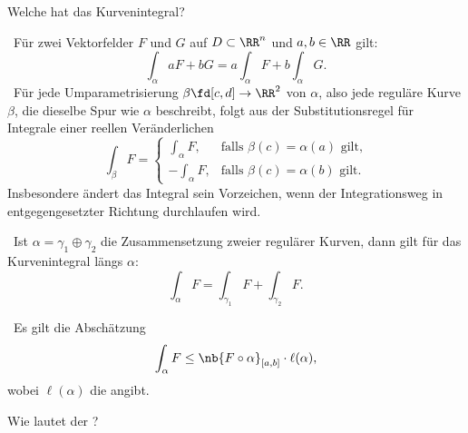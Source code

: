 \begin{frage}
  Welche  hat das Kurvenintegral?
\end{frage}

\begin{antwort}
  \, Für zwei Vektorfelder $F$ und $G$ auf $D\subset\RR^n$ 
  und $a , b\in \RR$ gilt:
  \[
  \int_{\alpha} a F + b G   = 
  a\int_\alpha F   + b\int_\alpha G.
  \]
  \noindent
  \, Für jede Umparametrisierung 
  $\beta\fd [c,d] \to \RR^2$ von $\alpha$, 
  also jede reguläre Kurve $\beta$, 
  die dieselbe Spur wie $\alpha$ beschreibt,  
  folgt aus der Substitutionsregel für Integrale einer reellen Veränderlichen
  \[
  \int_\beta F  = \left\{ \begin{array}{rr} 
      \int_\alpha F , &\text{falls $\beta(c)=\alpha(a)$ gilt,}\\
      -\int_\alpha F , &\text{falls $\beta(c)=\alpha(b)$ gilt}.
    \end{array}\right.
  \]
  Insbesondere ändert das Integral sein Vorzeichen, wenn der Integrationsweg 
  in entgegengesetzter Richtung durchlaufen wird.   

  \noindent
  \, Ist $\alpha=\gamma_1 \oplus \gamma_2$ die Zusammensetzung 
  zweier regulärer Kurven, dann gilt für das Kurvenintegral 
  längs $\alpha$: 
  \[
  \int_\alpha F = \int_{\gamma_1} F + 
  \int_{\gamma_2} F.
  \]

  \noindent
  \, Es gilt die Abschätzung 
  \[
  \int_\alpha F \le \nb{ F\circ \alpha }_{[a,b]} \cdot \ell( \alpha ), 
  \]
  wobei $\ell(\alpha)$ die  angibt. 
  \AntEnd
\end{antwort} 

\begin{frage}\label{12_hauptsatz}
  Wie lautet der ?
\end{frage}

